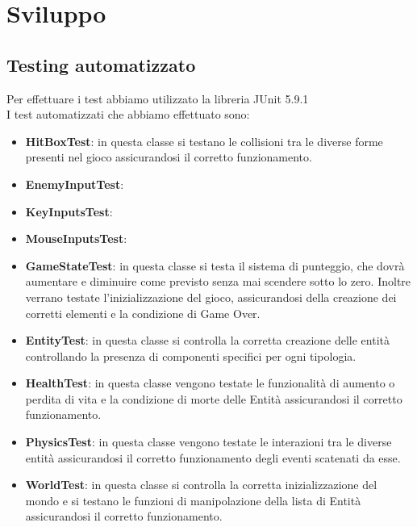 \documentclass[a4paper,12pt]{report}
\begin{document}
\chapter{Sviluppo}

\section{Testing automatizzato}

Per effettuare i test abbiamo utilizzato la libreria JUnit 5.9.1
\\I test automatizzati che abbiamo effettuato sono:
\begin{itemize}
    \item \textbf{HitBoxTest}: in questa classe si testano le collisioni tra le diverse forme presenti nel gioco assicurandosi il corretto funzionamento.
    
    \item \textbf{EnemyInputTest}:
    
    \item \textbf{KeyInputsTest}:
    
    \item \textbf{MouseInputsTest}:
    
    \item \textbf{GameStateTest}: in questa classe si testa il sistema di punteggio, che dovrà aumentare e diminuire come previsto senza mai scendere sotto lo zero. Inoltre verrano testate l'inizializzazione del gioco, assicurandosi della creazione dei corretti elementi e la condizione di Game Over.
    
    \item \textbf{EntityTest}: in questa classe si controlla la corretta creazione delle entità controllando la presenza di componenti specifici per ogni tipologia.
    
    \item \textbf{HealthTest}: in questa classe vengono testate le funzionalità di aumento o perdita di vita e la condizione di morte delle Entità assicurandosi il corretto funzionamento.
    
    \item \textbf{PhysicsTest}: in questa classe vengono testate le interazioni tra le diverse entità assicurandosi il corretto funzionamento degli eventi scatenati da esse.
    
    \item \textbf{WorldTest}: in questa classe si controlla la corretta inizializzazione del mondo e si testano le funzioni di manipolazione della lista di Entità assicurandosi il corretto funzionamento.
\end{itemize}
\end{document}
